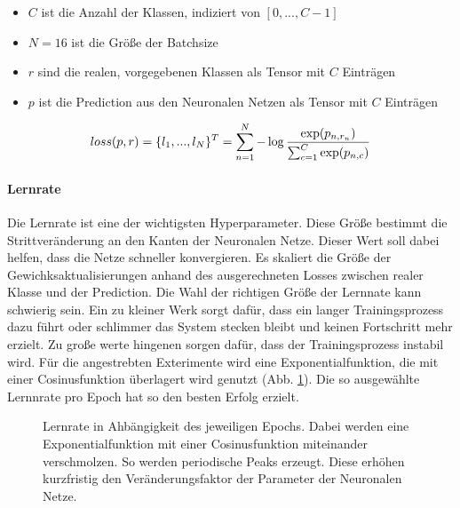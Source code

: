\vspace{-0.2cm}

\begin{itemize}
  \setlength\itemsep{-0.5em}
\item $C$ ist die Anzahl der Klassen, indiziert von $[0, ..., C-1]$
\item $N = 16$ ist die Größe der Batchsize
\item $r$ sind die realen, vorgegebenen Klassen als Tensor mit $C$ Einträgen
\item $p$ ist die Prediction aus den Neuronalen Netzen als Tensor mit $C$ Einträgen
\end{itemize}

\vspace{-0.5cm}

\begin{equation}\centering
loss(p, r) = \{l_1, ... ,l_N\}^T = \sum_{n=1}^N {- \log \frac{\exp(p_{n,r_n})}{\sum_{c=1}^C \exp(p_{n,c})}}
\label{eq:loss}
\end{equation}


\paragraph{Lernrate} Die Lernrate ist eine der wichtigsten Hyperparameter. Diese Größe bestimmt die Strittveränderung an den Kanten der Neuronalen Netze. Dieser Wert soll dabei helfen, dass die Netze schneller konvergieren. Es skaliert die Größe der Gewichksaktualisierungen anhand des ausgerechneten Losses zwischen realer Klasse und der Prediction. Die Wahl der richtigen Größe der Lernnate kann schwierig sein. Ein zu kleiner Werk sorgt dafür, dass ein langer Trainingsprozess dazu führt oder schlimmer das System stecken bleibt und keinen Fortschritt mehr erzielt. Zu große werte hingenen sorgen dafür, dass der Trainingsprozess instabil wird. Für die angestrebten Exterimente wird eine Exponentialfunktion, die mit einer Cosinusfunktion überlagert wird genutzt (Abb. \ref{cap:lrrate}). Die so ausgewählte Lernnrate pro Epoch hat so den besten Erfolg erzielt.

\vspace{-0.8cm}

\begin{figure}[!h]\centering
\makebox[0pt]{}
\caption[Lernrate in Ahbängigkeit des jeweiligen Epochs]{Lernrate in Ahbängigkeit des jeweiligen Epochs. Dabei werden eine Exponentialfunktion mit einer Cosinusfunktion miteinander verschmolzen. So werden periodische Peaks erzeugt. Diese erhöhen kurzfristig den Veränderungsfaktor der Parameter der Neuronalen Netze.}\label{cap:lrrate}
\end{figure}\label{fig:lrrate}













